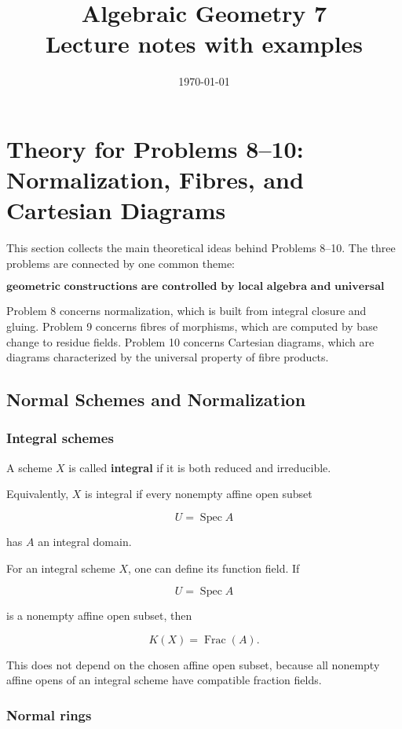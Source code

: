 \documentclass[12pt,a4paper]{article}
\title{\bfseries Algebraic Geometry 7\\


\large Lecture notes with examples}
\author{}
\date{\today}
\theoremstyle{notespace}
\begin{document}
\maketitle
\tableofcontents
\clearpage

\section{Theory for Problems 8--10: Normalization, Fibres, and Cartesian Diagrams}

This section collects the main theoretical ideas behind Problems 8--10.
The three problems are connected by one common theme:

\[
\textbf{geometric constructions are controlled by local algebra and universal properties.}
\]

Problem 8 concerns normalization, which is built from integral closure and gluing.
Problem 9 concerns fibres of morphisms, which are computed by base change to residue fields.
Problem 10 concerns Cartesian diagrams, which are diagrams characterized by the universal property of fibre products.

\subsection{Normal Schemes and Normalization}

\subsubsection{Integral schemes}

A scheme \(X\) is called \textbf{integral} if it is both reduced and irreducible.

Equivalently, \(X\) is integral if every nonempty affine open subset

\[
U=\operatorname{Spec}A
\]

has \(A\) an integral domain.

For an integral scheme \(X\), one can define its function field. If

\[
U=\operatorname{Spec}A
\]

is a nonempty affine open subset, then

\[
K(X)=\operatorname{Frac}(A).
\]

This does not depend on the chosen affine open subset, because all nonempty affine opens of an integral scheme have compatible fraction fields.

\subsubsection{Normal rings}
\end{document}
